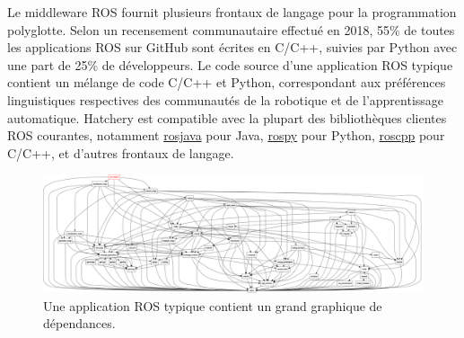 Le middleware ROS fournit plusieurs frontaux de langage pour la programmation polyglotte. Selon un recensement communautaire effectué en 2018, 55\% de toutes les applications ROS sur GitHub sont écrites en C/C++, suivies par Python avec une part de 25\% de développeurs. Le code source d'une application ROS typique contient un mélange de code C/C++ et Python, correspondant aux préférences linguistiques respectives des communautés de la robotique et de l'apprentissage automatique. Hatchery est compatible avec la plupart des bibliothèques clientes ROS courantes, notamment \href{https://wiki.ros.org/rosjava}{rosjava} pour Java, \href{https://wiki.ros.org/rospy}{rospy} pour Python, \href{https://wiki.ros.org/rospy}{roscpp} pour C/C++, et d'autres frontaux de langage.

\begin{figure}
    \centering
    \includegraphics[width=\textwidth]{../figures/rqt_dep_graph.png}
    \caption{Une application ROS typique contient un grand graphique de dépendances.}
\end{figure}

